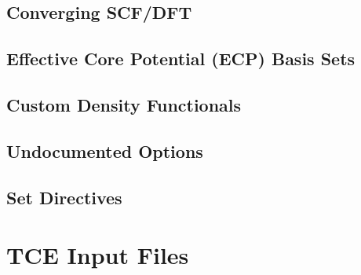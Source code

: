 \documentclass[letterpaper,12pt]{article}
\begin{document}
\newpage

\subsection{Converging SCF/DFT}\label{sec:ConvergingSCF}

\newpage

\subsection{Effective Core Potential (ECP) Basis Sets}\label{sec:ECPBasisSets}

\newpage

\subsection{Custom Density Functionals}\label{sec:CustomDensityFunctionals}

\newpage

\subsection{Undocumented Options}\label{sec:UndocumentedOptions}

\newpage

\subsection{Set Directives}\label{sec:SetDirectives}

\newpage

\section{TCE Input Files}\label{sec:TCEInputFiles}

\newpage
\end{document}

